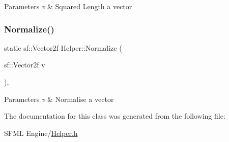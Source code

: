 \begin{DoxyParams}{Parameters}
{\em v} & Squared Length a vector \\
\hline
\end{DoxyParams}
\mbox{\label{class_helper_a7565c8f3c91f44e139d7a4aaef6e0e34}} 
\subsubsection{\texorpdfstring{Normalize()}{Normalize()}}
{\footnotesize\ttfamily static sf\+::\+Vector2f Helper\+::\+Normalize (\begin{DoxyParamCaption}\item[{sf\+::\+Vector2f}]{v }\end{DoxyParamCaption})\hspace{0.3cm}{\ttfamily [inline]}, {\ttfamily [static]}}


\begin{DoxyParams}{Parameters}
{\em v} & Normalise a vector \\
\hline
\end{DoxyParams}


The documentation for this class was generated from the following file\+:\begin{DoxyCompactItemize}
\item 
S\+F\+M\+L Engine/\hyperlink{_helper_8h}{Helper.\+h}\end{DoxyCompactItemize}
